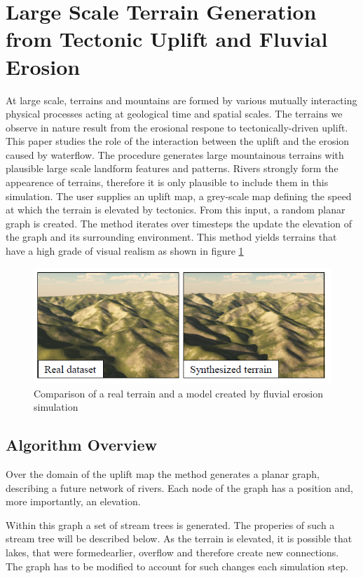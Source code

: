 \section{Large Scale Terrain Generation from Tectonic Uplift and Fluvial Erosion}
At large scale, terrains and mountains are formed by various mutually interacting physical processes acting at geological time and spatial scales. The terrains we observe in nature result from the erosional respone to tectonically-driven uplift. This paper\cite{cordonnier2016large} studies the role of the interaction between the uplift and the erosion caused by waterflow. The procedure generates large mountainous terrains with plausible large scale landform features and patterns. Rivers strongly form the appearence of terrains, therefore it is only plausible to include them in this simulation.
The user supplies an uplift map, a grey-scale map defining the speed at which the terrain is elevated by tectonics. From this input, a random planar graph is created. The method iterates over timesteps the update the elevation of the graph and its surrounding environment. This method yields terrains that have a high grade of visual realism as shown in figure \ref{fig:visual_realism}

\begin{figure}[htb]	
	\centering
	\includegraphics[width=\linewidth]{cordonnier2016large/visual_realism}
	\caption{Comparison of a real terrain and a model created by fluvial erosion simulation}
	\label{fig:visual_realism}
\end{figure}

\subsection{Algorithm Overview}
Over the domain of the uplift map the method generates a planar graph, describing a future network of rivers. Each node of the graph has a position and, more importantly, an elevation. 

Within this graph a set of stream trees is generated. The properies of such a stream tree will be described below. As the terrain is elevated, it is possible that lakes, that were formedearlier, overflow and therefore create new connections. The graph has to be modified to account for such changes each simulation step. 

